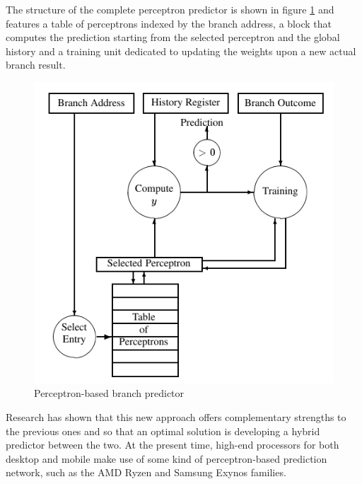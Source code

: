 The structure of the complete perceptron predictor is shown in figure \ref{fig:perceptron-bp} and features a table of perceptrons indexed by the branch address, a block that computes the prediction starting from the selected perceptron and the global history and a training unit dedicated to updating the weights upon a new actual branch result.
\begin{figure}[hbtp]
  \centering
  \includegraphics[width=.8\textwidth]{img/perceptron-bp.pdf}
  \caption{Perceptron-based branch predictor}
  \label{fig:perceptron-bp}
\end{figure}

Research \cite{jimenez01} has shown that this new approach offers complementary strengths to the previous ones and so that an optimal solution is developing a hybrid predictor between the two. At the present time, high-end processors for both desktop and mobile make use of some kind of perceptron-based prediction network, such as the AMD Ryzen and Samsung Exynos families.
